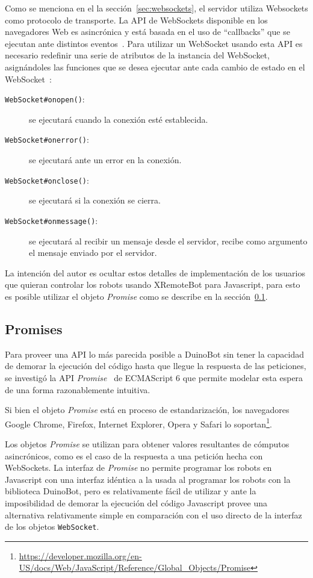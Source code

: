 Como se menciona en el la sección~\ref{sec:websockets}, el servidor
utiliza Websockets como protocolo de transporte.
La API de WebSockets disponible en los navegadores Web es asincrónica y
está basada en el uso de ``callbacks''
que se ejecutan ante distintos eventos~\citep{wang_2013}.
Para utilizar un WebSocket usando esta API es necesario
redefinir una serie de atributos de la instancia del WebSocket,
asignándoles las funciones que se
desea ejecutar ante cada cambio de estado en el
WebSocket~\citep{websocket_2014}:
\begin{description}
    \item[\texttt{WebSocket\#onopen()}:] se ejecutará cuando
    la conexión esté establecida.
    \item[\texttt{WebSocket\#onerror()}:] se ejecutará ante un error en
    la conexión.
    \item[\texttt{WebSocket\#onclose()}:] se ejecutará si la conexión
    se cierra.
    \item[\texttt{WebSocket\#onmessage()}:] se ejecutará al recibir un
    mensaje desde el servidor, recibe como argumento el mensaje
    enviado por el servidor.
\end{description}

La intención del autor es ocultar estos detalles de implementación de
los usuarios que quieran controlar los robots usando XRemoteBot para Javascript,
para esto es posible utilizar el objeto \textit{Promise} como se describe
en la sección~\ref{sec:promises}.

\subsection{Promises}\label{sec:promises}

Para proveer una API lo más parecida posible a DuinoBot sin
tener la capacidad de demorar la ejecución del código hasta que
llegue la respuesta de las peticiones, se investigó la API
\textit{Promise}~\citep{ECMA-262} de ECMAScript 6 que permite modelar
esta espera de una forma razonablemente intuitiva.

Si bien el objeto \textit{Promise} está en proceso de estandarización,
los navegadores Google Chrome, Firefox, Internet Explorer, Opera y Safari lo
soportan\footnote{\url{https://developer.mozilla.org/en-US/docs/Web/JavaScript/Reference/Global_Objects/Promise}}.

Los objetos \textit{Promise} se utilizan para obtener valores resultantes
de cómputos asincrónicos, como es el caso de la respuesta a una petición
hecha con WebSockets. La interfaz de \textit{Promise} no permite programar
los robots en Javascript con una interfaz idéntica a la usada al programar
los robots con la biblioteca DuinoBot, pero es relativamente fácil de
utilizar y ante la imposibilidad de demorar la ejecución del código
Javascript provee una alternativa
relativamente simple en comparación con el uso directo de la interfaz
de los objetos \texttt{WebSocket}.

